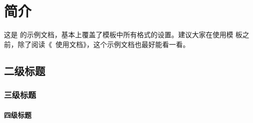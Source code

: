 \chapter{简介}

这是 \bjfuthesis 的示例文档，基本上覆盖了模板中所有格式的设置。建议大家在使用模
板之前，除了阅读《\bjfuthesis\ 使用文档》，这个示例文档也最好能看一看。

\section{二级标题}

\subsection{三级标题}

\subsubsection{四级标题}